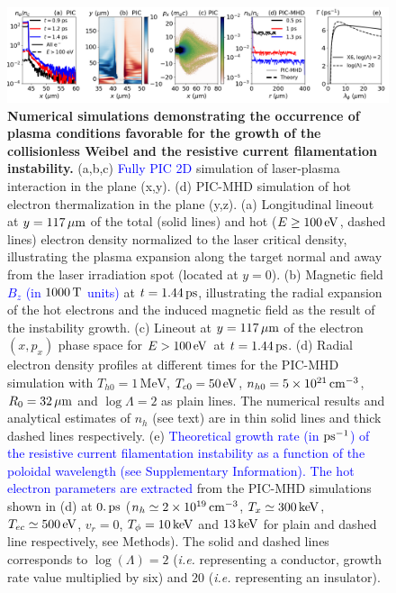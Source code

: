 \documentclass[aps,twocolumn,showpacs,superscriptaddress]{revtex4}
\begin{document}
\begin{figure}[tbh!]
\includegraphics[scale=0.4]{figure_3.png}
\caption{\label{fig:pic} 
\textbf{Numerical simulations demonstrating the occurrence of plasma conditions favorable for the growth of the collisionless Weibel and the resistive current filamentation instability.}
(a,b,c) \textcolor{blue}{Fully PIC 2D} simulation of laser-plasma interaction in the plane (x,y).
(d) PIC-MHD simulation of hot electron thermalization in the plane (y,z).
(a) Longitudinal lineout at $y=117\,\rm \mu m$ of the total (solid lines) and hot ($E\ge 100\,\rm eV$, dashed lines) electron density normalized to the laser critical density, illustrating the plasma expansion along the target normal and away from the laser irradiation spot (located at $y=0$).  
(b) Magnetic field \textcolor{blue}{$B_z$ (in $1000\,\rm T$ units)} at $t =1.44\,\rm ps$, illustrating the radial expansion of the hot electrons and the induced magnetic field as the result of the instability growth.
(c) Lineout at $y = 117\,\rm \mu m$ of the electron $(x,p_x)$ phase space for $E>100\,\rm eV$  at $t =1.44\,\rm ps$. 
(d) Radial electron density profiles at different times  for the PIC-MHD simulation with $T_{h0} = 1\,\mathrm{MeV}$, $T_{c0} = 50\,\rm eV$, $n_{h0} = 5 \times 10^{21}\,\rm cm^{-3}$, $R_0 = 32\,\rm \mu m$ and $\log \Lambda =2$ as plain lines. The numerical results and analytical  estimates of $n_h$ (see text) are in thin solid lines and thick dashed lines respectively.
(e) \textcolor{blue}{Theoretical growth rate (in $\rm ps^{-1}$) of the resistive current filamentation instability as a function of the poloidal wavelength (see Supplementary Information). The hot electron parameters are extracted} from the PIC-MHD simulations shown in (d) at $0.\,\rm ps$ ($n_h \simeq 2\times 10^{19}\,\rm cm^{-3}$,  $T_{x} \simeq 300\,\rm keV$, $T_{ec} \simeq 500\,\rm eV$, $v_r=0$,  $T_\phi = 10\,\rm keV$ and $13\,\rm keV$ for plain  and dashed line respectively, see Methods). 
The solid and dashed lines corresponds to $\log(\Lambda)=2$ (\emph{i.e.} representing a conductor, growth rate value multiplied by six) and $20$ (\emph{i.e.} representing an insulator). 
}
\end{figure}
\end{document}
